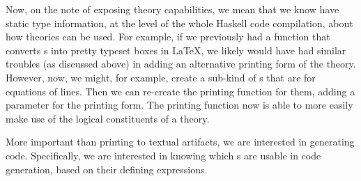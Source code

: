 Now, on the note of exposing theory capabilities, we mean that we know have
static type information, at the level of the whole Haskell code compilation,
about how theories can be used. For example, if we previously had a function
that converts \RelationConcept{}s into pretty typeset boxes in \LaTeX{}, we
likely would have had similar troubles (as discussed above) in adding an
alternative printing form of the theory. However, now, we might, for example,
create a sub-kind of \EquationalModel{}s that are for equations of lines. Then
we can re-create the printing function for them, adding a parameter for the
printing form. The printing function now is able to more easily make use of the
logical constituents of a theory.

More important than printing to textual artifacts, we are interested in
generating code. Specifically, we are interested in knowing which
\EquationalModel{}s are usable in code generation, based on their defining
expressions.
